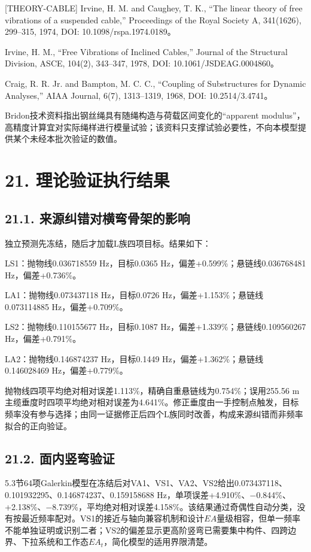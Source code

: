 \documentclass[UTF8,a4paper,11pt,fontset=none]{ctexart}
\begin{document}
[THEORY-CABLE] Irvine, H. M. and Caughey, T. K., “The linear theory of free vibrations of a suspended cable,” Proceedings of the Royal Society A, 341(1626), 299–315, 1974, DOI: 10.1098/rspa.1974.0189。\par
[THEORY-INCLINED-CABLE] Irvine, H. M., “Free Vibrations of Inclined Cables,” Journal of the Structural Division, ASCE, 104(2), 343–347, 1978, DOI: 10.1061/JSDEAG.0004860。\par
[THEORY-CMS] Craig, R. R. Jr. and Bampton, M. C. C., “Coupling of Substructures for Dynamic Analyses,” AIAA Journal, 6(7), 1313–1319, 1968, DOI: 10.2514/3.4741。\par
[ROPE-MODULUS-GUIDANCE] Bridon技术资料指出钢丝绳具有随绳构造与荷载区间变化的“apparent modulus”，高精度计算宜对实际绳样进行模量试验；该资料只支撑试验必要性，不向本模型提供某个未经本批次验证的数值。\par
{}
\section*{21. 理论验证执行结果}
\subsection*{21.1. 来源纠错对横弯骨架的影响}
独立预测先冻结，随后才加载L族四项目标。结果如下：\par
LS1：抛物线0.036718559 Hz，目标0.0365 Hz，偏差+0.599\%；悬链线0.036768481 Hz，偏差+0.736\%。\par
LA1：抛物线0.073437118 Hz，目标0.0726 Hz，偏差+1.153\%；悬链线0.073114885 Hz，偏差+0.709\%。\par
LS2：抛物线0.110155677 Hz，目标0.1087 Hz，偏差+1.339\%；悬链线0.109560267 Hz，偏差+0.791\%。\par
LA2：抛物线0.146874237 Hz，目标0.1449 Hz，偏差+1.362\%；悬链线0.146028469 Hz，偏差+0.779\%。\par
抛物线四项平均绝对相对误差1.113\%，精确自重悬链线为0.754\%；误用255.56 m主缆垂度时四项平均绝对相对误差为4.641\%。修正垂度由一手控制点触发，目标频率没有参与选择；由同一证据修正后四个L族同时改善，构成来源纠错而非频率拟合的正向验证。\par
{}
\subsection*{21.2. 面内竖弯验证}
5.3节64项Galerkin模型在冻结后对VA1、VS1、VA2、VS2给出0.073437118、0.101932295、0.146874237、0.159158688 Hz，单项误差+4.910\%、−0.844\%、+2.138\%、−8.739\%，平均绝对相对误差4.158\%。该结果通过奇偶性自动分类，没有按最近频率配对。VS1的接近与轴向兼容机制和设计\(EA\)\allowbreak{}量级相容，但单一频率不能单独证明或识别二者；VS2的偏差显示更高阶竖弯已需要集中构件、四跨边界、下拉系统和工作态\(EA_t\)\allowbreak{}，简化模型的适用界限清楚。\par
{}
\end{document}
